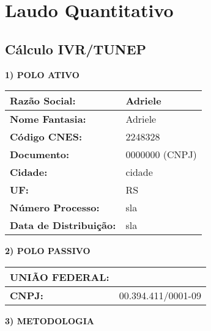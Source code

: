 \documentclass{article}
\begin{document}
    \pagestyle{empty}

    \section*{Laudo Quantitativo}
    \subsection*{Cálculo IVR/TUNEP}

    \textbf{1) POLO ATIVO}

    \begin{tabular}{l l}
    \hline
    \textbf{Razão Social:} & Adriele \\
    \hline
    \textbf{Nome Fantasia:} & Adriele \\
    \hline
    \textbf{Código CNES:} & 2248328 \\
    \hline
    \textbf{Documento:} & 0000000 (CNPJ) \\
    \hline
    \textbf{Cidade:} & cidade \\
    \hline
    \textbf{UF:} & RS \\
    \hline
    \textbf{Número Processo:} & sla \\
    \hline
    \textbf{Data de Distribuição:} & sla \\
    \hline
    \end{tabular}

    \vspace{10mm}

    \textbf{2) POLO PASSIVO}

    \begin{tabular}{l l}
    \hline
    \textbf{UNIÃO FEDERAL:} & \\
    \hline
    \textbf{CNPJ:} & 00.394.411/0001-09 \\
    \hline
    \end{tabular}

    \vspace{10mm}

    \textbf{3) METODOLOGIA}
\end{document}
